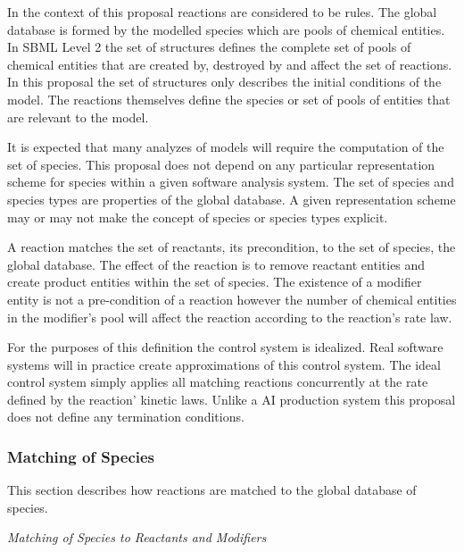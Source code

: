 \documentclass{cekarticle}
\begin{document}
In the context of this proposal reactions are considered to be
rules. The global database is formed by the modelled species which
are pools of chemical entities. In SBML Level 2 the set of
 structures defines the complete set of pools of
chemical entities that are created by, destroyed by and affect the
set of reactions. In this proposal the set of 
structures only describes the initial conditions of the model. The
reactions themselves define the species or set of pools of
entities that are relevant to the model.

It is expected that many analyzes of models will require the
computation of the set of species. This proposal does not depend
on any particular representation scheme for species within a given
software analysis system.  The set of species and species types
are properties of the global database.  A given representation
scheme may or may not make the concept of species or species types
explicit.

A reaction matches
the set of reactants, its precondition, to the set of species, the global database.  The effect of the
reaction is to remove reactant entities and create product entities within the set of species.
The existence of a modifier entity is not a pre-condition of a reaction however the number of
chemical entities in the modifier's pool will affect the reaction according to the reaction's
rate law.

For the purposes of this definition the control system is
idealized. Real software systems will in practice create
approximations of this control system.  The ideal control system
simply applies all matching reactions concurrently at the rate
defined by the reaction' kinetic laws.  Unlike a AI production
system this proposal does not define any termination conditions.

\subsubsection{Matching of Species}

This section describes how reactions are matched to the global database of species.

\emph{Matching of Species to Reactants and Modifiers}
\end{document}
